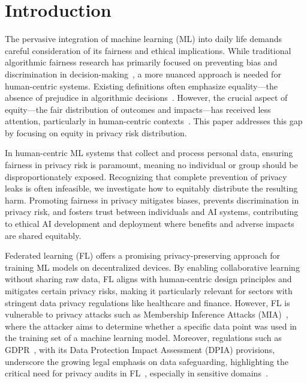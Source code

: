 \section{Introduction}\label{intro}




The pervasive integration of machine learning (ML) into daily life demands careful consideration of its fairness and ethical implications. While traditional algorithmic fairness research has primarily focused on preventing bias and discrimination in decision-making~\cite{kleinberg2018algorithmic,rambachan2020economic, dwork2012fairness, kusner2017counterfactual, zhao2024fairo}, a more nuanced approach is needed for human-centric systems. Existing definitions often emphasize equality—the absence of prejudice in algorithmic decisions~\cite{mehrabi2021survey}. However, the crucial aspect of equity—the fair distribution of outcomes and impacts—has received less attention, particularly in human-centric contexts~\cite{zhao2024fina}. This paper addresses this gap by focusing on equity in privacy risk distribution.


In human-centric ML systems that collect and process personal data, ensuring fairness in privacy risk is paramount, meaning no individual or group should be disproportionately exposed. Recognizing that complete prevention of privacy leaks is often infeasible, we investigate how to equitably distribute the resulting harm. Promoting fairness in privacy mitigates biases, prevents discrimination in privacy risk, and fosters trust between individuals and AI systems, contributing to ethical AI development and deployment where benefits and adverse impacts are shared equitably.

Federated learning (FL) offers a promising privacy-preserving approach for training ML models on decentralized devices. By enabling collaborative learning without sharing raw data, FL aligns with human-centric design principles and mitigates certain privacy risks, making it particularly relevant for sectors with stringent data privacy regulations like healthcare and finance. However, FL is vulnerable to privacy attacks such as Membership Inference Attacks (MIA)~\cite{shokri2017membership}, where the attacker aims to determine whether a specific data point was used in the training set of a machine learning model. Moreover, regulations such as GDPR~\cite{GDPR}, with its Data Protection Impact Assessment (DPIA) provisions, underscore the growing legal emphasis on data safeguarding, highlighting the critical need for privacy audits in FL~\cite{chang2024efficient}, especially in sensitive domains~\cite{rieke2020future}. 

